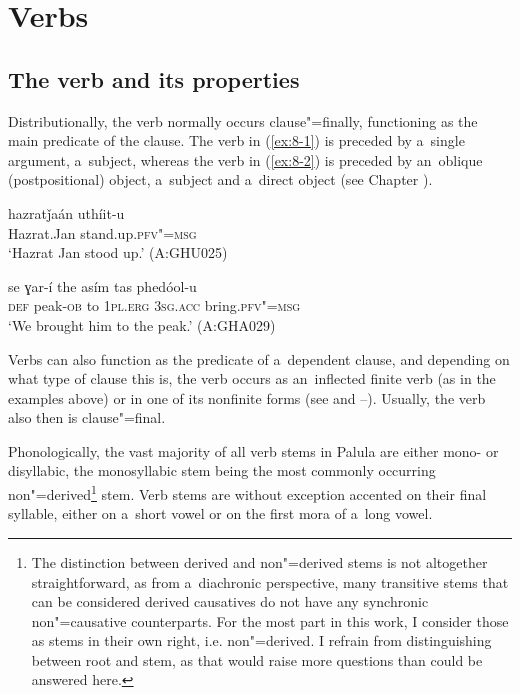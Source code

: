 \chapter{Verbs}
\label{chap:8}

\section{The verb and its properties}
\label{sec:8-1}



Distributionally, the verb normally occurs clause"=finally, functioning as the main predicate of the clause. The verb in (\ref{ex:8-1}) is preceded by a~single argument, a~subject, whereas the verb in (\ref{ex:8-2}) is preceded by an~oblique (postpositional) object, a~subject and a~direct object (see Chapter ).

\begin{exe}
\ex
\label{ex:8-1}
\gll hazratǰaán uthíit-u \\
Hazrat.Jan stand.up.\textsc{pfv"=msg} \\
\glt `Hazrat Jan stood up.' (A:GHU025)
\end{exe}
\begin{exe}
\ex
\label{ex:8-2}
\gll se ɣar-í the asím tas phedóol-u \\
\textsc{def} peak-\textsc{ob} to \textsc{1pl.erg} \textsc{3sg.acc} bring.\textsc{pfv"=msg} \\
\glt `We brought him to the peak.' (A:GHA029)
\end{exe}

Verbs can also function as the predicate of a~dependent clause, and depending on what type of clause this is, the verb occurs as an~inflected finite verb (as in the examples above) or in one of its nonfinite forms (see  and --). Usually, the verb also then is clause"=final.


Phonologically, the vast majority of all verb stems in Palula are either mono- or disyllabic, the monosyllabic stem being the most commonly occurring non"=derived\footnote{The distinction between derived and non"=derived stems is not altogether straightforward, as from a~diachronic perspective, many transitive stems that can be considered derived causatives do not have any synchronic non"=causative counterparts. For the most part in this work, I consider those as stems in their own right, i.e. non"=derived. I refrain from distinguishing between root and stem, as that would raise more questions than could be answered here.} stem. Verb stems are without exception accented on their final syllable, either on a~short vowel or on the first mora of a~long vowel. 


